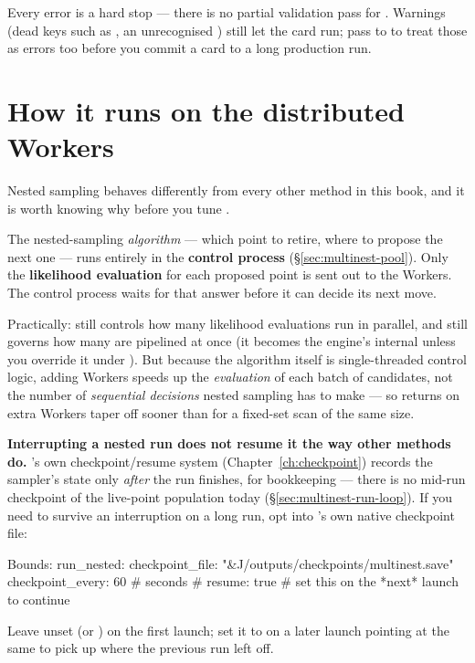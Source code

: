 \begin{jnote}
Every error is a hard stop --- there is no partial validation pass for
. Warnings (dead keys such as , an
unrecognised  ) still let the card run; pass
 to  to treat those as errors too before you
commit a card to a long production run.
\end{jnote}

\section{How it runs on the distributed Workers}
\label{sec:nested-distributed}

Nested sampling behaves differently from every other method in this book, and it is
worth knowing why before you tune .

\begin{jnote}
The nested-sampling \emph{algorithm} --- which point to retire, where to propose the
next one --- runs entirely in the \textbf{control process}
(\S\ref{sec:multinest-pool}). Only the \textbf{likelihood evaluation} for each
proposed point is sent out to the Workers. The control process waits for that answer
before it can decide its next move.
\end{jnote}

Practically:  still controls how many likelihood
evaluations run in parallel, and  still governs how
many are pipelined at once (it becomes the engine's internal 
unless you override it under ). But because the
algorithm itself is single-threaded control logic, adding Workers speeds up the
\emph{evaluation} of each batch of candidates, not the number of \emph{sequential
decisions} nested sampling has to make --- so returns on extra Workers taper off
sooner than for a fixed-set scan of the same size.

\begin{jwarn}
\textbf{Interrupting a nested run does not resume it the way other methods do.} \Jtwo's
own checkpoint/resume system (Chapter~\ref{ch:checkpoint}) records the sampler's state
only \emph{after} the run finishes, for bookkeeping --- there is no mid-run checkpoint
of the live-point population today (\S\ref{sec:multinest-run-loop}). If you need to
survive an interruption on a long run, opt into 's own native checkpoint
file:
\begin{yamlwin}
Bounds:
  run_nested:
    checkpoint_file: "&J/outputs/checkpoints/multinest.save"
    checkpoint_every: 60      # seconds
    # resume: true            # set this on the *next* launch to continue
\end{yamlwin}
Leave  unset (or ) on the first launch; set it to
 on a later launch pointing at the same  to pick
up where the previous run left off.
\end{jwarn}

